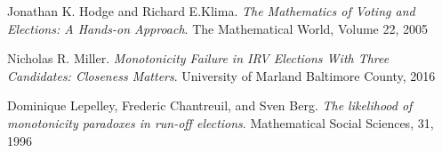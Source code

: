 \documentclass{article}
\begin{document}
\newpage

\begin{thebibliography}{9}
Jonathan K. Hodge and Richard E.Klima. \textit{The Mathematics of Voting and Elections: A Hands-on Approach}. The Mathematical World, Volume 22, 2005

Nicholas R. Miller. \textit{Monotonicity Failure in IRV Elections With Three Candidates: Closeness Matters}. University of Marland Baltimore County, 2016

Dominique Lepelley, Frederic Chantreuil, and Sven Berg. \textit{The likelihood of monotonicity paradoxes in run-off elections}. Mathematical Social Sciences, 31, 1996
\end{thebibliography}
\end{document}
